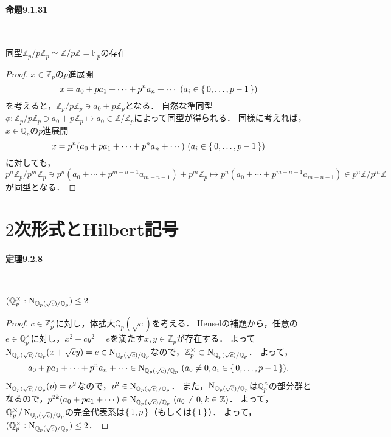 \paragraph{命題9.1.31}~
\begin{screen}
  同型$ \mathbb{Z}_p/p \mathbb{Z}_p \simeq \mathbb{Z}/p \mathbb{Z} = \mathbb{F}_p$の存在
\end{screen}
\begin{proof}
  $x \in \mathbb{Z}_p$の$p$進展開
  \[x = a_0+pa_1+ \cdots+p^na_n+ \cdots \ (a_i \in \set{0, \ldots, p-1}) \]
  を考えると，$ \mathbb{Z}_p/p \mathbb{Z}_p \ni a_0+p \mathbb{Z}_p$となる．
  自然な準同型$ \phi: \mathbb{Z}_p/p \mathbb{Z}_p \ni a_0+p \mathbb{Z}_p \mapsto a_0 \in \mathbb{Z}/\mathbb{Z}_p$によって同型が得られる．
  同様に考えれば，$x \in \mathbb{Q}_p$の$p$進展開
  \[x = p^n(a_0+pa_1+ \cdots+p^na_n+ \cdots) \ (a_i \in \set{0, \ldots, p-1}) \]
  に対しても，
  \[p^n \mathbb{Z}_p/p^m \mathbb{Z}_p \ni p^n(a_0+ \cdots+p^{m-n-1}a_{m-n-1})+p^m \mathbb{Z}_p \mapsto p^n(a_0+ \cdots+p^{m-n-1}a_{m-n-1}) \in p^n \mathbb{Z}/p^m \mathbb{Z} \]
  が同型となる．
\end{proof}

\section{$2$次形式とHilbert記号}
\paragraph{定理9.2.8}~
\begin{screen}
  $( \mathbb{Q}_p^ \times: \operatorname{N}_{ \mathbb{Q}_p( \sqrt{c})/\mathbb{Q}_p}) \leq 2$
\end{screen}
\begin{proof}
  $c \in \mathbb{Z}_p^ \times$に対し，体拡大$ \mathbb{Q}_p( \sqrt{c})$を考える．
  Henselの補題から，任意の$e \in \mathbb{Q}_p^ \times$に対し，$x^2-cy^2 = e$を満たす$x, y \in \mathbb{Z}_p$が存在する．
  よって$ \operatorname{N}_{ \mathbb{Q}_p( \sqrt{c})/\mathbb{Q}_p}(x+ \sqrt{c}y) = e \in \operatorname{N}_{ \mathbb{Q}_p( \sqrt{c})/\mathbb{Q}_p}$なので，$ \mathbb{Z}_p^ \times \subset \operatorname{N}_{ \mathbb{Q}_p( \sqrt{c})/\mathbb{Q}_p}$．
  よって，
  \[a_0+pa_1+ \cdots+p^na_n+ \cdots \in \operatorname{N}_{ \mathbb{Q}_p( \sqrt{c})/\mathbb{Q}_p} \ (a_0 \neq0, a_i \in \set{0, \ldots, p-1}). \]
  $ \operatorname{N}_{ \mathbb{Q}_p( \sqrt{c})/\mathbb{Q}_p}(p) = p^2$なので，$p^2 \in \operatorname{N}_{ \mathbb{Q}_p( \sqrt{c})/\mathbb{Q}_p}$．
  また，$ \operatorname{N}_{ \mathbb{Q}_p( \sqrt{c})/\mathbb{Q}_p}$は$ \mathbb{Q}_p^ \times$の部分群となるので，$p^{2k}(a_0+pa_1+ \cdots) \in \operatorname{N}_{ \mathbb{Q}_p( \sqrt{c})/\mathbb{Q}_p} \ (a_0 \neq 0, k \in \mathbb{Z})$．
  よって，$ \mathbb{Q}_p^ \times/\operatorname{N}_{ \mathbb{Q}_p( \sqrt{c})/\mathbb{Q}_p}$の完全代表系は$ \set{1, p}$（もしくは$ \set{1}$）．
  よって，$( \mathbb{Q}_p^ \times: \operatorname{N}_{ \mathbb{Q}_p( \sqrt{c})/\mathbb{Q}_p}) \leq 2$．
\end{proof}
